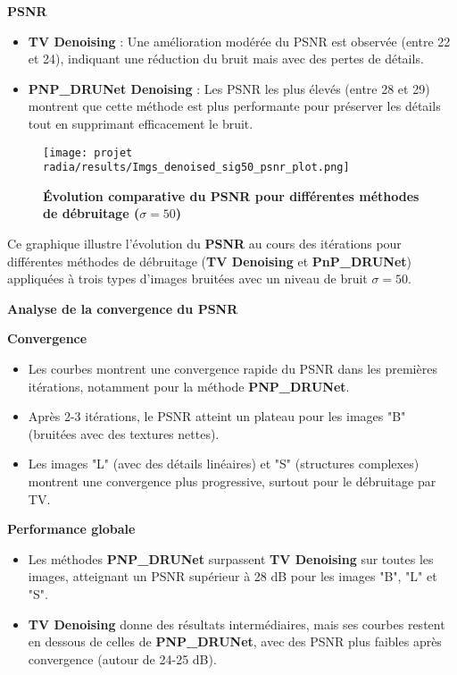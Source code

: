\documentclass[a4paper, 12pt]{report} %
\begin{document}
\textbf{PSNR}
\begin{itemize}
    \item \textbf{TV Denoising} :  
    Une amélioration modérée du PSNR est observée (entre 22 et 24), indiquant une réduction du bruit mais avec des pertes de détails.
    
    \item \textbf{PNP\_DRUNet Denoising} :  
    Les PSNR les plus élevés (entre 28 et 29) montrent que cette méthode est plus performante pour préserver les détails tout en supprimant efficacement le bruit.
\end{itemize}


\begin{figure}[H]
    \centering
    \texttt{[image: projet radia/results/Imgs\_denoised\_sig50\_psnr\_plot.png]}
    \caption{ \textbf{Évolution comparative du PSNR pour différentes méthodes de débruitage (\(\sigma = 50\))}
 }
    \label{fig:6}
\end{figure} 
Ce graphique illustre l'évolution du \textbf{PSNR} au cours des itérations pour différentes méthodes de débruitage (\textbf{TV Denoising} et \textbf{PnP\_DRUNet}) appliquées à trois types d’images bruitées avec un niveau de bruit $\sigma = 50$.

\textbf{Analyse de la convergence du PSNR}

\textbf{Convergence}
\begin{itemize}
    \item Les courbes montrent une convergence rapide du PSNR dans les premières itérations, notamment pour la méthode \textbf{PNP\_DRUNet}.
    \item Après 2-3 itérations, le PSNR atteint un plateau pour les images "B" (bruitées avec des textures nettes).
    \item Les images "L" (avec des détails linéaires) et "S" (structures complexes) montrent une convergence plus progressive, surtout pour le débruitage par TV.
\end{itemize}

\textbf{Performance globale}
\begin{itemize}
    \item Les méthodes \textbf{PNP\_DRUNet} surpassent \textbf{TV Denoising} sur toutes les images, atteignant un PSNR supérieur à 28 dB pour les images "B", "L" et "S".
    \item \textbf{TV Denoising} donne des résultats intermédiaires, mais ses courbes restent en dessous de celles de \textbf{PNP\_DRUNet}, avec des PSNR plus faibles après convergence (autour de 24-25 dB).
\end{itemize}
\end{document}
